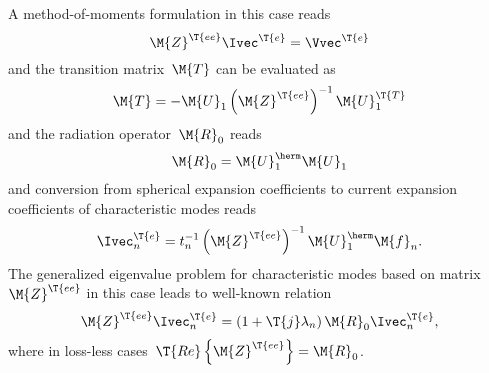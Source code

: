 \documentclass[journal]{IEEEtran}
\providecommand{\Umat}{\M{U}} %
\providecommand{\Ie}{\Ivec^{\T{e}}} %
\providecommand{\Ve}{\Vvec^{\T{e}}} %
\begin{document}
A method-of-moments formulation in this case reads
\begin{equation}
    \label{eq:MoMJEFIE}
    \M{Z}^\T{ee} \Ie = \Ve
\end{equation}
and the transition matrix~$\M{T}$ can be evaluated as
\begin{equation}
\M{T} = - \Umat_1 \left( \M{Z}^\T{ee} \right)^{-1} \Umat_1^\T{T}
\end{equation}
and the radiation operator~$\M{R}_0$ reads
\begin{equation}
\label{eq:R0JEFIE}
    \M{R}_0 = \Umat_1^\herm \Umat_1
\end{equation}
and conversion from spherical expansion coefficients to current expansion coefficients of characteristic modes reads
\begin{equation}
    \label{eq:CM4JEFIE}
    \Ie_n = t_n^{-1} \left( \M{Z}^\T{ee} \right)^{-1} \Umat_1^\herm 
    \M{f}_n.
\end{equation}
The generalized eigenvalue problem for characteristic modes based on matrix~$\M{Z}^\T{ee}$ in this case leads to well-known relation~\cite{HarringtonMautz_TheoryOfCharacteristicModesForConductingBodies}
\begin{equation}
    \M{Z}^\T{ee} \Ie_n = \left(1 + \T{j}\lambda_n \right) \M{R}_0 \Ie_n,
    \label{eq:app:EFIEGEP}
\end{equation}
where in loss-less cases~$\T{Re} \left\{ \M{Z}^\T{ee} \right\} = \M{R}_0$.
\end{document}
